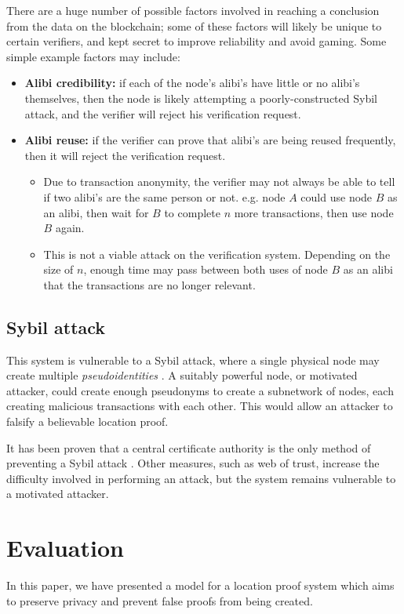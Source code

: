 \documentclass[12pt]{article}
\begin{document}
There are a huge number of possible factors involved in reaching a conclusion from the data on the blockchain; some of these factors will likely be unique to certain verifiers, and kept secret to improve reliability and avoid gaming. Some simple example factors may include:
\begin{itemize}
	\item \textbf{Alibi credibility:} if each of the node’s alibi’s have little or no alibi’s themselves, then the node is likely attempting a poorly-constructed Sybil attack, and the verifier will reject his verification request.
	\item \textbf{Alibi reuse:} if the verifier can prove that alibi’s are being reused frequently, then it will reject the verification request.
	\begin{itemize}
		\item Due to transaction anonymity, the verifier may not always be able to tell if two alibi's are the same person or not. e.g. node $A$ could use node $B$ as an alibi, then wait for $B$ to complete $n$ more transactions, then use node $B$ again.
		\item This is not a viable attack on the verification system. Depending on the size of $n$, enough time may pass between both uses of node $B$ as an alibi that the transactions are no longer relevant.
	\end{itemize}
\end{itemize}

\subsection{Sybil attack}
This system is vulnerable to a Sybil attack, where a single physical node may create multiple \textit{pseudoidentities} \cite{sybil}. A suitably powerful node, or motivated attacker, could create enough pseudonyms to create a subnetwork of nodes, each creating malicious transactions with each other. This would allow an attacker to falsify a believable location proof.

It has been proven that a central certificate authority is the only method of preventing a Sybil attack \cite{sybil}. Other measures, such as web of trust, increase the difficulty involved in performing an attack, but the system remains vulnerable to a motivated attacker.

\newpage
\section{Evaluation}
In this paper, we have presented a model for a location proof system which aims to preserve privacy and prevent false proofs from being created.
\end{document}
